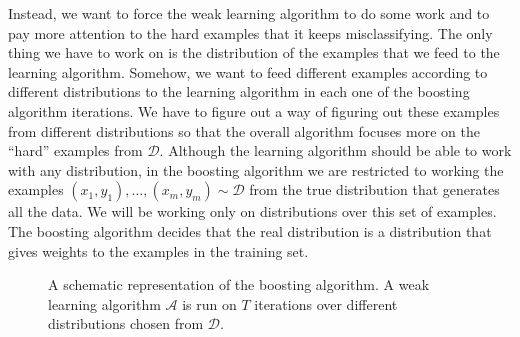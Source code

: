 \documentclass[10pt ]{article}
\begin{document}
Instead, we want to force the weak learning algorithm to do some work and to pay more attention to the hard examples that it keeps misclassifying. The only thing we have to work on is the distribution of the examples that we feed to the learning algorithm. Somehow, we want to feed different examples according to different distributions to the learning algorithm in each one of the boosting algorithm iterations. We have to figure out a way of figuring out these examples from different distributions so that the overall algorithm focuses more on the ``hard'' examples from $\mathcal{D}$. Although the learning algorithm should be able to work with any distribution, in the boosting algorithm we are restricted to working the examples $(x_1,y_1),\dots,(x_m,y_m) \sim \mathcal{D}$ from the true distribution that generates all the data. We will be working only on distributions over this set of examples. The boosting algorithm decides that the real distribution is a distribution that gives weights to the examples in the training set.
\begin{figure}
\centering
{}
\caption{A schematic representation of the boosting algorithm. A weak learning algorithm $\mathcal{A}$ is run on $T$ iterations over different distributions chosen from $\mathcal{D}$.}
\label{fig_boosting}
\end{figure}
\end{document}
